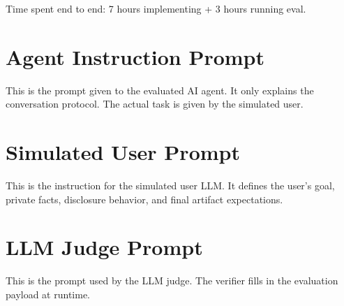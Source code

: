 \documentclass[11pt]{article}
\begin{document}
Time spent end to end: 7 hours implementing + 3 hours running eval.

\appendix

\section{Agent Instruction Prompt}

This is the prompt given to the evaluated AI agent. It only explains the
conversation protocol. The actual task is given by the simulated user.



\section{Simulated User Prompt}

This is the instruction for the simulated user LLM. It defines the user's goal,
private facts, disclosure behavior, and final artifact expectations.



\section{LLM Judge Prompt}

This is the prompt used by the LLM judge. The verifier fills in the evaluation
payload at runtime.


\end{document}

